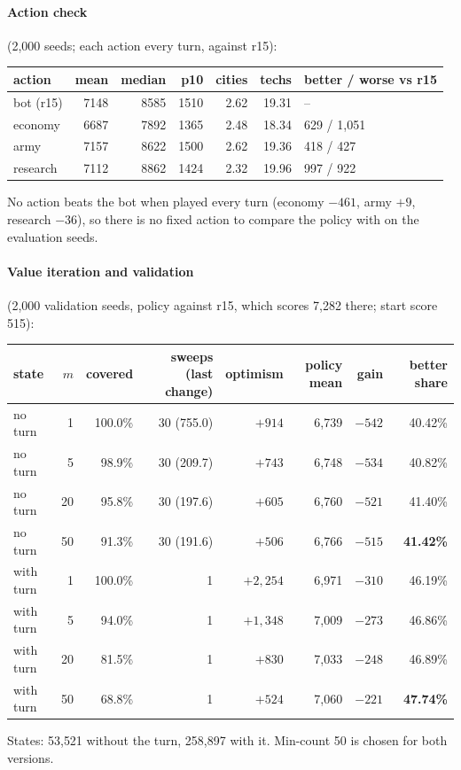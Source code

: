 \documentclass{../polyexp}
\begin{document}
\paragraph{Action check} (2{,}000 seeds; each action every turn, against r15):

\begin{center}\small
\begin{tabular}{lrrrrrl}
\toprule
action & mean & median & p10 & cities & techs & better / worse vs r15 \\
\midrule
bot (r15)  & 7148 & 8585 & 1510 & 2.62 & 19.31 & -- \\
economy    & 6687 & 7892 & 1365 & 2.48 & 18.34 & 629 / 1{,}051 \\
army       & 7157 & 8622 & 1500 & 2.62 & 19.36 & 418 / 427 \\
research   & 7112 & 8862 & 1424 & 2.32 & 19.96 & 997 / 922 \\
\bottomrule
\end{tabular}
\end{center}
No action beats the bot when played every turn (economy $-461$, army $+9$, research $-36$), so there is no fixed
action to compare the policy with on the evaluation seeds.

\paragraph{Value iteration and validation} (2{,}000 validation seeds, policy against r15, which scores 7{,}282 there;
start score 515):

\begin{center}\small
\begin{tabular}{lrrrrrrr}
\toprule
state & $m$ & covered & sweeps (last change) & optimism & policy mean & gain & better share \\
\midrule
no turn   & 1  & 100.0\% & 30 (755.0) & $+914$     & 6{,}739 & $-542$ & 40.42\% \\
no turn   & 5  & 98.9\%  & 30 (209.7) & $+743$     & 6{,}748 & $-534$ & 40.82\% \\
no turn   & 20 & 95.8\%  & 30 (197.6) & $+605$     & 6{,}760 & $-521$ & 41.40\% \\
no turn   & 50 & 91.3\%  & 30 (191.6) & $+506$     & 6{,}766 & $-515$ & \textbf{41.42\%} \\
with turn & 1  & 100.0\% & 1          & $+2{,}254$ & 6{,}971 & $-310$ & 46.19\% \\
with turn & 5  & 94.0\%  & 1          & $+1{,}348$ & 7{,}009 & $-273$ & 46.86\% \\
with turn & 20 & 81.5\%  & 1          & $+830$     & 7{,}033 & $-248$ & 46.89\% \\
with turn & 50 & 68.8\%  & 1          & $+524$     & 7{,}060 & $-221$ & \textbf{47.74\%} \\
\bottomrule
\end{tabular}
\end{center}
States: 53{,}521 without the turn, 258{,}897 with it. Min-count 50 is chosen for both versions.
\end{document}
